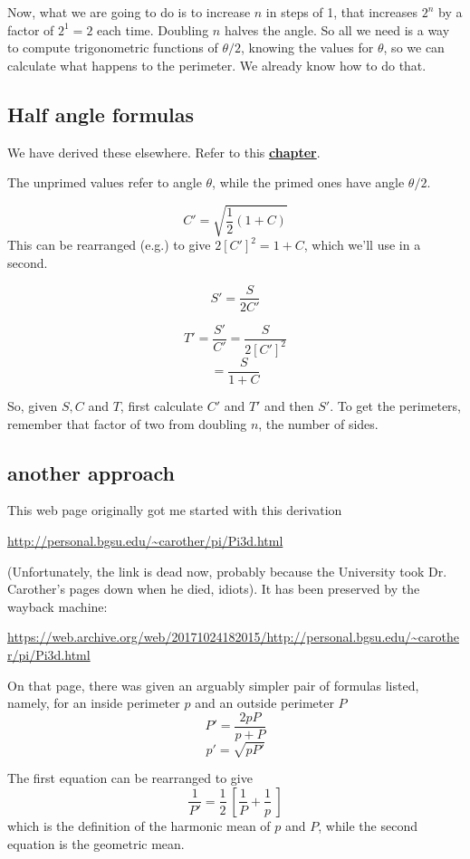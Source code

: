 \documentclass[11pt, oneside]{article}
\begin{document}
Now, what we are going to do is to increase $n$ in steps of 1, that increases $2^n$ by a factor of $2^1 = 2$ each time.  Doubling $n$ halves the angle.  So all we need is a way to compute trigonometric functions of $\theta/2$, knowing the values for $\theta$, so we can calculate what happens to the perimeter.  We already know how to do that.

\subsection*{Half angle formulas}

We have derived these elsewhere.  Refer to this \hyperref[sec:double_half_angles]{\textbf{chapter}}.

The unprimed values refer to angle $\theta$, while the primed ones have angle $\theta/2$.

\[ C' = \sqrt{\frac{1}{2} (1 + C)}  \]
This can be rearranged (e.g.) to give $2[C']^2 = 1 + C$, which we'll use in a second.

\[ S' = \frac{S}{2 C'} \]

\[ T' = \frac{S'}{C'} = \frac{S}{2 [C']^2} \]
\[  = \frac{S}{1 + C} \]

So, given $S, C$ and $T$, first calculate $C'$ and $T'$ and then $S'$.  To get the perimeters, remember that factor of two from doubling $n$, the number of sides.

\subsection*{another approach}

This web page originally got me started with this derivation

\url{http://personal.bgsu.edu/~carother/pi/Pi3d.html}

(Unfortunately, the link is dead now, probably because the University took Dr. Carother's pages down when he died, idiots).  It has been preserved by the wayback machine:

\url{https://web.archive.org/web/20171024182015/http://personal.bgsu.edu/~carother/pi/Pi3d.html}

On that page, there was given an arguably simpler pair of formulas listed, namely, for an inside perimeter $p$ and an outside perimeter $P$
\[ P' = \frac{2pP}{p + P} \]
\[ p' = \sqrt{pP'} \]

The first equation can be rearranged to give
\[ \frac{1}{P'} = \frac{1}{2} \ [ \frac{1}{P} + \frac{1}{p} \ ] \]
which is the definition of the harmonic mean of $p$ and $P$, while the second equation is the geometric mean.
\end{document}
